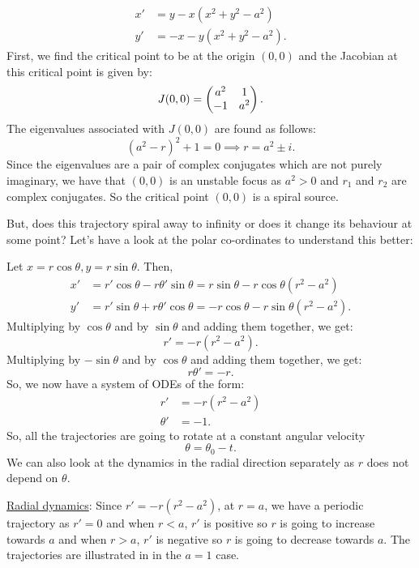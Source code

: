\begin{eg}\label{eg:periodicsol}
	\begin{align*}
		x' &= y - x(x^2 + y^2 - a^2) \\
		y' &= -x -y(x^2 + y^2 - a^2).
	\end{align*}
	First, we find the critical point to be at the origin $(0,0)$ and the Jacobian at this critical point is given by: 
	\[
	J(0,0) = \begin{pmatrix}a^2 & 1 \\ -1 & a^2\end{pmatrix}.
	\]
	The eigenvalues associated with $J(0,0)$ are found as follows: 
	\[
	(a^2 - r)^2 + 1 = 0 \implies r = a^2 \pm i.
	\]
	Since the eigenvalues are a pair of complex conjugates which are not purely imaginary, we have that $(0,0)$ is an unstable focus as $a^2 > 0$ and $r_1$ and $r_2$ are complex conjugates. So the critical point $(0,0)$ is a spiral source.
	
	But, does this trajectory spiral away to infinity or does it change its behaviour at some point? Let's have a look at the polar co-ordinates to understand this better:
	
	Let $x = r \cos{\theta}, y = r \sin{\theta}$. Then,
	\begin{align}
		\label{eq3.14}
		x' &= r' \cos{\theta} - r \theta' \sin{\theta} = r \sin{\theta} - r \cos{\theta}(r^2 - a^2) \\
		\label{eq3.15}
		y' &= r' \sin{\theta} + r \theta' \cos{\theta} = - r \cos{\theta} - r \sin{\theta}(r^2 - a^2).
	\end{align}
	Multiplying  by $\cos{\theta}$ and  by $\sin{\theta}$ and adding them together, we get:
	\[
	r' = -r(r^2 - a^2).
	\]
	Multiplying  by $-\sin{\theta}$ and  by $\cos{\theta}$ and adding them together, we get:
	\[
	r\theta' = -r.
	\]
	So, we now have a system of ODEs of the form:
	\begin{align*}
		r' &= -r(r^2 - a^2) \\
		\theta' &= -1.
	\end{align*}
	So, all the trajectories are going to rotate at a constant angular velocity 
	\[
	\theta = \theta_0 - t.
	\]
	We can also look at the dynamics in the radial direction separately as $r$ does not depend on $\theta$.
	
	\underline{Radial dynamics}: Since $r' = -r(r^2 - a^2)$, at $r=a$, we have a periodic trajectory as $r' = 0$ and when $r<a$, $r'$ is positive so $r$ is going to increase towards $a$ and when $r>a$, $r'$ is negative so $r$ is going to decrease towards $a$. The trajectories are illustrated in  in the $a=1$ case.
\end{eg}

